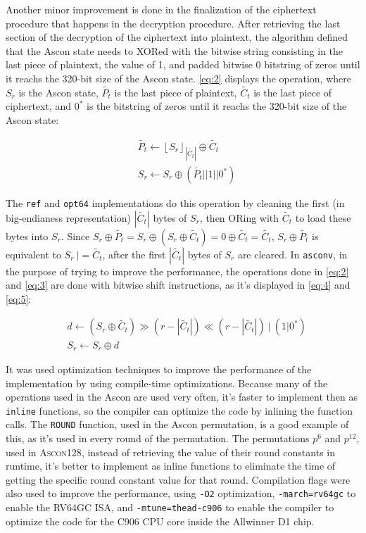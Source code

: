 \documentclass[11pt,twoside]{article}
\begin{document}
Another minor improvement is done in the finalization of the ciphertext procedure that happens in the decryption procedure. After retrieving the last section of the decryption of the ciphertext into plaintext, the algorithm defined that the Ascon state needs to XORed with the bitwise string consisting in the last piece of plaintext, the value of 1, and padded bitwise 0 bitstring of zeros until it reachs the 320-bit size of the Ascon state. \cref{eq:2} displays the operation, where $S_r$ is the Ascon state, $\tilde{P_t}$ is the last piece of plaintext, $\tilde{C_t}$ is the last piece of ciphertext, and $0^*$ is the bitstring of zeros until it reachs the 320-bit size of the Ascon state:

\begin{align}
   & \tilde{P_{t}} \leftarrow  {\left \lfloor S_{r}  \right \rfloor}_{\left| \tilde{C_{t}} \right|} \oplus \tilde{C_{t}} \label{eq:2} \\
   & S_r \leftarrow S_r \oplus (\tilde{P_{t}} || 1 || 0^{*}) \label{eq:3}
\end{align}

The \texttt{ref} and \texttt{opt64} implementations do this operation by cleaning the first (in big-endianess representation) $| \tilde{C_{t}} |$ bytes of $S_r$, then ORing with $\tilde{C_t}$ to load these bytes into $S_r$. Since $S_r \oplus \tilde{P_t} = S_r \oplus  (S_r \oplus \tilde{C_t}) = 0 \oplus \tilde{C_t} = \tilde{C_t}$, $S_r \oplus \tilde{P_t}$ is equivalent to $S_{r} \ |= \tilde{C_t}$, after the first $| \tilde{C_{t}} |$ bytes of $S_r$ are cleared. In \texttt{asconv}, in the purpose of trying to improve the performance, the operations done in \cref{eq:2} and \cref{eq:3} are done with bitwise shift instructions, as it's displayed in \cref{eq:4} and \cref{eq:5}:

\begin{align}
   & d \leftarrow (S_r \oplus \tilde{C_{t}}) \gg (r - | \tilde{C_{t}}|) \ll (r - | \tilde{C_{t}} |) \ | \ (1|0^*) \label{eq:4} \\
   & S_r \leftarrow S_r \oplus d \label{eq:5}
\end{align}

It was used optimization techniques to improve the performance of the implementation by using compile-time optimizations. Because many of the operations used in the Ascon are used very often, it's faster to implement then as \texttt{inline} functions, so the compiler can optimize the code by inlining the function calls. The \texttt{ROUND} function, used in the Ascon permutation, is a good example of this, as it's used in every round of the permutation. The permutations $p^6$ and $p^{12}$, used in \textsc{Ascon128}, instead of retrieving the value of their round constants in runtime, it's better to implement as inline functions to eliminate the time of getting the specific round constant value for that round. Compilation flags were also used to improve the performance, using \texttt{-O2} optimization, \texttt{-march=rv64gc} to enable the RV64GC ISA, and \texttt{-mtune=thead-c906} to enable the compiler to optimize the code for the C906 CPU core inside the Allwinner D1 chip.
\end{document}
